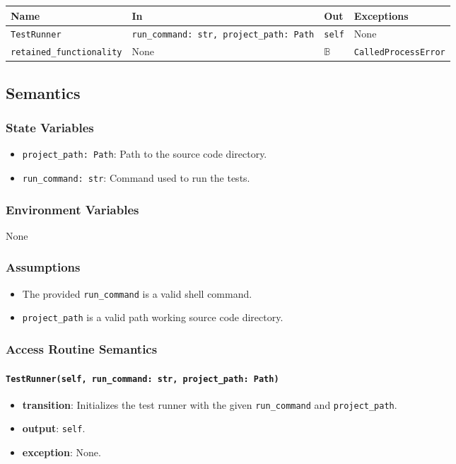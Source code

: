 \documentclass[12pt, titlepage]{article}
\begin{document}
\begin{tabularx}{\linewidth}{|l|>{\raggedright\arraybackslash}X|l|l|}
\hline
\textbf{Name} & \textbf{In} & \textbf{Out} & \textbf{Exceptions} \\
\hline
\texttt{TestRunner} & \texttt{run\_command: str, project\_path: Path} & \texttt{self} & None \\
\hline
\texttt{retained\_functionality} & None & $\mathbb{B}$ & \texttt{CalledProcessError} \\
\hline
\end{tabularx}

\subsection{Semantics}

\subsubsection{State Variables}
\begin{itemize}
  \item \texttt{project\_path: Path}: Path to the source code directory.
  \item \texttt{run\_command: str}: Command used to run the tests.
\end{itemize}

\subsubsection{Environment Variables}
None

\subsubsection{Assumptions}
\begin{itemize}
  \item The provided \texttt{run\_command} is a valid shell command.
  \item \texttt{project\_path} is a valid path working source code directory.
\end{itemize}

\subsubsection{Access Routine Semantics}

\paragraph{\texttt{TestRunner(self, run\_command: str, project\_path: Path)}}
\begin{itemize}
  \item \textbf{transition}: Initializes the test runner with the given \texttt{run\_command} and \texttt{project\_path}.
  \item \textbf{output}: \texttt{self}.
  \item \textbf{exception}: None.
\end{itemize}
\end{document}
